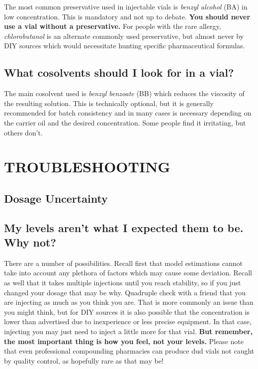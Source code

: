 \documentclass{article}
\begin{document}
{{The most common preservative used in injectable vials is \textit{benzyl alcohol} (BA) in low concentration. This is mandatory and not up to debate. \textbf{You should never use a vial without a preservative. }For people with the rare allergy, \textit{chlorobutanol }is an alternate commonly used preservative, but almost never by DIY sources which would necessitate hunting specific pharmaceutical formulas.

\subsection{What cosolvents should I look for in a vial?}

The main cosolvent used is \textit{benzyl benzoate} (BB) which reduces the viscosity of the resulting solution. This is technically optional, but it is generally recommended for batch consistency and in many cases is necessary depending on the carrier oil and the desired concentration. Some people find it irritating, but others don’t. 

 

\section{TROUBLESHOOTING}

\subsection*{Dosage Uncertainty}

\subsection{My levels aren’t what I expected them to be. Why not?}

There are a number of possibilities. Recall first that model estimations cannot take into account any plethora of factors which may cause some deviation. Recall as well that it takes multiple injections until you reach stability, so if you just changed your dosage that may be why. Quadruple check with a friend that you are injecting as much as you think you are. That is more commonly an issue than you might think, but for DIY sources it is also possible that the concentration is lower than advertised due to inexperience or less precise equipment. In that case, injecting you may just need to inject a little more for that vial. \textbf{But remember, the most important thing is how you feel, not your levels. }Please note that even professional compounding pharmacies can produce dud vials not caught by quality control, as hopefully rare as that may be!

}}
\end{document}
